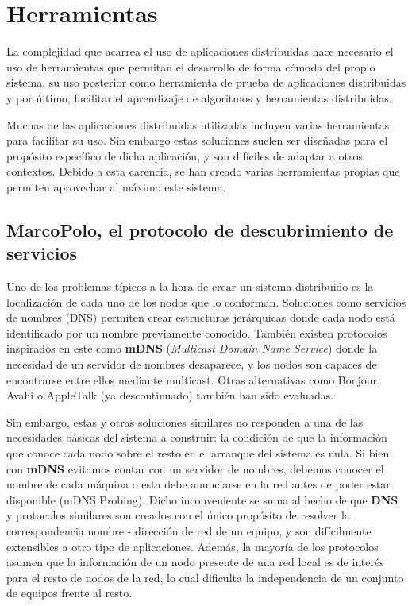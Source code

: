 \chapter{Herramientas}

La complejidad que acarrea el uso de aplicaciones distribuidas hace necesario el uso de herramientas que permitan el desarrollo de forma cómoda del propio sistema, su uso posterior como herramienta de prueba de aplicaciones distribuidas y por último, facilitar el aprendizaje de algoritmos y herramientas distribuidas.

Muchas de las aplicaciones distribuidas utilizadas incluyen varias herramientas para facilitar su uso. Sin embargo estas soluciones suelen ser diseñadas para el propósito específico de dicha aplicación, y son difíciles de adaptar a otros contextos. Debido a esta carencia, se han creado varias herramientas propias que permiten aprovechar al máximo este sistema.

\section{MarcoPolo, el protocolo de descubrimiento de servicios}
\label{marcopolo}
Uno de los problemas típicos a la hora de crear un sistema distribuido es la localización de cada uno de los nodos que lo conforman. Soluciones como servicios de nombres (DNS) permiten crear estructuras jerárquicas donde cada nodo está identificado por un nombre previamente conocido. También existen protocolos inspirados en este como \textbf{mDNS} (\textit{Multicast Domain Name Service}) donde la necesidad de un servidor de nombres desaparece, y los nodos son capaces de encontrarse entre ellos mediante multicast\cite{rfc6762}. Otras alternativas como Bonjour, Avahi o AppleTalk (ya descontinuado) también han sido evaluadas.

Sin embargo, estas y otras soluciones similares no responden a una de las necesidades básicas del sistema a construir: la condición de que la información que conoce cada nodo sobre el resto en el arranque del sistema es nula. Si bien con \textbf{mDNS} evitamos contar con un servidor de nombres, debemos conocer el nombre de cada máquina o esta debe anunciarse en la red antes de poder estar disponible (mDNS Probing). Dicho inconveniente se suma al hecho de que \textbf{DNS} y protocolos similares son creados con el único propósito de resolver la correspondencia nombre - dirección de red de un equipo, y son difícilmente extensibles a otro tipo de aplicaciones. Además, la mayoría de los protocolos asumen que la información de un nodo presente de una red local es de interés para el resto de nodos de la red, lo cual dificulta la independencia de un conjunto de equipos frente al resto.

